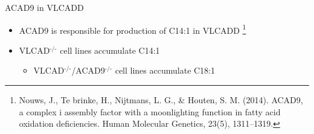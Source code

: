 \documentclass[presentation, smaller]{beamer}
\begin{document}
\begin{frame}[label={sec:orgheadline7}]{ACAD9 in VLCADD}
\begin{itemize}
\item ACAD9 is responsible for production of C14:1 in VLCADD \footnote{Nouws, J., Te brinke, H., Nijtmans, L. G., \& Houten,
S. M. (2014). ACAD9, a complex i assembly factor with a moonlighting
function in fatty acid oxidation deficiencies. Human Molecular
Genetics, 23(5), 1311–1319.}
\item VLCAD\(^{\text{-/-}}\) cell lines accumulate C14:1
\begin{itemize}
\item VLCAD\(^{\text{-/-}}\)/ACAD9\(^{\text{-/-}}\) cell lines accumulate C18:1
\end{itemize}
\end{itemize}
\end{frame}
\end{document}

